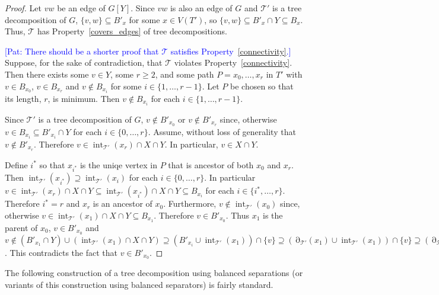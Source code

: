 \documentclass{patmorin}
\newcommand{\pat}[1]{\textcolor{Blue}{[Pat: #1]}}
\DeclareMathOperator{\interior}{int}
\DeclareMathOperator{\boundary}{\partial}
\begin{document}
\begin{proof}
  Let $vw$ be an edge of $G[Y]$.  Since $vw$ is also an edge of $G$ and  $\mathcal{T'}$ is a tree decomposition of $G$,  $\{v,w\}\subseteq B'_x$ for some $x\in V(T')$, so $\{v,w\}\subseteq B'_x\cap Y\subseteq  B_x$. Thus, $\mathcal{T}$ has Property~\ref{covers_edges} of tree decompositions.

  \pat{There should be a shorter proof that $\mathcal{T}$ satisfies Property~\ref{connectivity}.}
  Suppose, for the sake of contradiction, that $\mathcal{T}$ violates Property~\ref{connectivity}.  Then there exists some $v\in Y$, some $r\ge 2$, and some path $P=x_0,\ldots,x_r$ in $T'$ with $v\in B_{x_0}$, $v\in B_{x_r}$ and $v\not\in B_{x_i}$ for some $i\in\{1,\ldots,r-1\}$.  Let $P$ be chosen so that its length, $r$, is minimum.  Then $v\not\in B_{x_i}$ for each $i\in\{1,\ldots,r-1\}$.

  Since $\mathcal{T}'$ is a tree decomposition of $G$, $v\not\in B'_{x_0}$ or $v\not\in B'_{x_r}$ since, otherwise $v\in B_{x_i}\subseteq B'_{x_i}\cap Y$ for each $i\in\{0,\ldots,r\}$.  Assume, without loss of generality that $v\not\in B'_{x_r}$. Therefore $v\in\interior_{\mathcal{T}'}(x_r)\cap X\cap Y$.  In particular, $v\in X\cap Y$.

  Define $i^*$ so that $x_{i^*}$ is the uniqe vertex in $P$ that is ancestor of both $x_0$ and $x_r$.  Then  $\interior_{\mathcal{T}'}(x_{i^*})\supseteq \interior_{\mathcal{T}'}(x_i)$ for each $i\in\{0,\ldots,r\}$.  In particular $v\in \interior_{\mathcal{T}'}(x_r)\cap X\cap Y\subseteq\interior_{\mathcal{T}'}(x_{i^*})\cap X\cap Y\subseteq B_{x_{i}}$ for each $i\in\{i^*,\ldots,r\}$.  Therefore $i^*=r$ and $x_r$ is an ancestor of $x_0$. Furthermore, $v\not\in\interior_{\mathcal{T}'}(x_0)$ since, otherwise $v\in\interior_{\mathcal{T}'}(x_1)\cap X\cap Y\subseteq B_{x_1}$. Therefore $v\in B'_{x_0}$.  Thus $x_1$ is the parent of $x_0$, $v\in B'_{x_0}$ and $v\not\in (B'_{x_1}\cap Y)\cup (\interior_{\mathcal{T}'}(x_1)\cap X\cap Y)
  \supseteq (B'_{x_i}\cup \interior_{\mathcal{T}'}(x_1))\cap\{v\}
  \supseteq (\boundary_{\mathcal{T}'}(x_1)\cup \interior_{\mathcal{T}'}(x_1))\cap\{v\} \supseteq (\boundary_{\mathcal{T}'}(x_0)\cup \interior_{\mathcal{T}'}(x_0))\cap \{v\} \supseteq B'_{x_0}\cap\{v\}$. This contradicts the fact that $v\in B'_{x_0}$.
\end{proof}


The following construction of a tree decomposition using balanced separations (or variants of this construction using balanced separators) is fairly standard.
\end{document}
